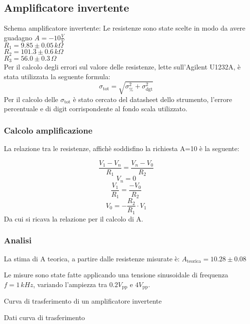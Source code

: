 \subsection{Amplificatore invertente}
Schema amplificatore invertente:
Le resistenze sono state scelte in modo da avere guadagno $A=-10 \frac{V}{V}$\\
$R_1=9.85 \pm 0.05\,k\Omega $\\ %
$R_2=101.3 \pm 0.6\,k\Omega$\\ %
$R_3=56.0 \pm 0.3\,\Omega$\\ %

Per il calcolo degli errori sul valore delle resistenze, lette sull'Agilent U1232A, è stata utilizzata la seguente formula:
$$\sigma_\textrm{tot}=\sqrt{ \sigma^{2} _\textrm{\%} + \sigma^{2} _\textrm{dgt}}$$
Per il calcolo delle $\sigma_\textrm{tot}$ è stato cercato del datasheet dello strumento, l'errore percentuale e di digit
corrispondente al fondo scala utilizzato.

\subsubsection{Calcolo amplificazione}
La relazione tra le resistenze, affichè soddisfino la richiesta A=10 è la seguente:

$$\frac{V_1-V_n}{R_1}=\frac{V_n-V_0}{R_2}$$
$$V_n=0$$
$$\frac{V_1}{R_1}=\frac{-V_0}{R_2}$$
$$V_0=-\frac{R_2}{R_1} \cdot V_1$$
Da cui si ricava la relazione per il calcolo di A.

\subsubsection{Analisi}
La stima di A teorica, a partire dalle resistenze misurate è:
$A_\textrm{teorica}=10.28 \pm 0.08$ %

Le misure sono state fatte applicando una tensione sinusoidale di frequenza $ f=1 \,kHz$, variando l'ampiezza tra 
$0.2 V_\textrm{pp}$ e $4 V_\textrm{pp}$.

\begin{grafico}
 \centering
 \resizebox{\textwidth}{!}{%
 
 }%
 \caption{Curva di trasferimento di un amplificatore invertente} 
 \label{gr:amp_inv.tex} 
\end{grafico}

\begin{tabella}
 \centering
  
 \caption{Dati curva di trasferimento}
 \label{tab:tab_inv.tex}
\end{tabella}

